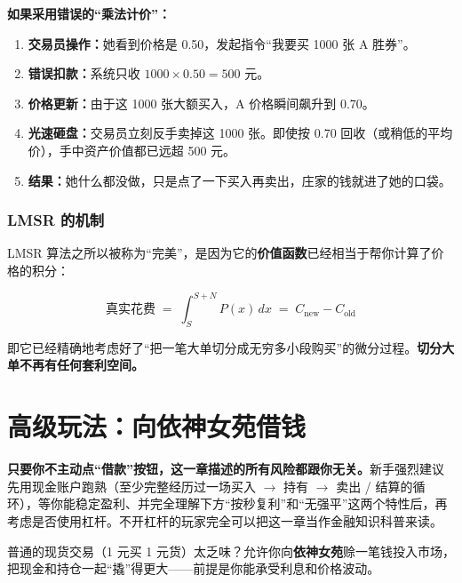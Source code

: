 \documentclass[11pt,a4paper,twoside]{article}
\begin{document}
\textbf{如果采用错误的“乘法计价”：}

\begin{enumerate}
  \item \textbf{交易员操作：}她看到价格是 0.50，发起指令“我要买 1000 张 A 胜券”。
  \item \textbf{错误扣款：}系统只收 $1000 \times 0.50 = 500$ 元。
  \item \textbf{价格更新：}由于这 1000 张大额买入，A 价格瞬间飙升到 0.70。
  \item \textbf{光速砸盘：}交易员立刻反手卖掉这 1000 张。即使按 0.70 回收（或稍低的平均价），手中资产价值都已远超 500 元。
  \item \textbf{结果：}她什么都没做，只是点了一下买入再卖出，庄家的钱就进了她的口袋。
\end{enumerate}

\subsubsection*{LMSR 的机制}

LMSR 算法之所以被称为“完美”，是因为它的\textbf{价值函数}已经相当于帮你计算了价格的积分：

\begin{mathbox}
\[
  \text{真实花费} \;=\; \int_{S}^{S+N} P(x)\,dx \;=\; C_{\text{new}} - C_{\text{old}}
\]
\end{mathbox}

即它已经精确地考虑好了“把一笔大单切分成无穷多小段购买”的微分过程。\textbf{切分大单不再有任何套利空间。}

\clearpage

\section{高级玩法：向依神女苑借钱}

\begin{notebox}
\textbf{只要你不主动点“借款”按钮，这一章描述的所有风险都跟你无关。}\;新手强烈建议先用现金账户跑熟（至少完整经历过一场买入 $\to$ 持有 $\to$ 卖出 / 结算的循环），等你能稳定盈利、并完全理解下方“按秒复利”和“无强平”这两个特性后，再考虑是否使用杠杆。不开杠杆的玩家完全可以把这一章当作金融知识科普来读。
\end{notebox}


普通的现货交易（1 元买 1 元货）太乏味？允许你向\textbf{依神女苑}赊一笔钱投入市场，把现金和持仓一起“撬”得更大——前提是你能承受利息和价格波动。
\end{document}
